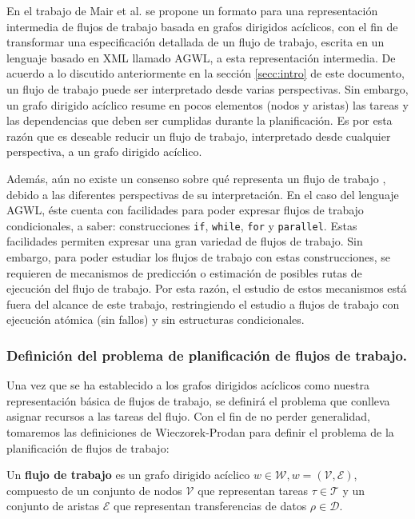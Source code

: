 En el trabajo de Mair et al. \cite{mair2007workflow} se propone un formato para una representación intermedia de flujos de trabajo basada en grafos dirigidos acíclicos, con el fin de transformar una especificación detallada de un flujo de trabajo, escrita en un lenguaje basado en XML llamado AGWL, a esta representación intermedia. De acuerdo a lo discutido anteriormente en la sección \ref{secc:intro} de este documento, un flujo de trabajo puede ser interpretado desde varias perspectivas. Sin embargo, un grafo dirigido acíclico resume en pocos elementos (nodos y aristas) las tareas y las dependencias que deben ser cumplidas durante la planificación. Es por esta razón que es deseable reducir un flujo de trabajo, interpretado desde cualquier perspectiva, a un grafo dirigido acíclico.

Además, aún no existe un consenso sobre qué representa un flujo de trabajo \cite{van2003workflow}, debido a las diferentes perspectivas de su interpretación. En el caso del lenguaje AGWL, éste cuenta con facilidades para poder expresar flujos de trabajo condicionales, a saber: construcciones \texttt{if}, \texttt{while}, \texttt{for} y \texttt{parallel}. Estas facilidades permiten expresar una gran variedad de flujos de trabajo. Sin embargo, para poder estudiar los flujos de trabajo con estas construcciones, se requieren de mecanismos de predicción o estimación de posibles rutas de ejecución del flujo de trabajo. Por esta razón, el estudio de estos mecanismos está fuera del alcance de este trabajo, restringiendo el estudio a flujos de trabajo con ejecución atómica (sin fallos) y sin estructuras condicionales.

\subsubsection{Definición del problema de planificación de flujos de trabajo.}
Una vez que se ha establecido a los grafos dirigidos acíclicos como nuestra representación básica de flujos de trabajo, se definirá el problema que conlleva asignar recursos a las tareas del flujo. Con el fin de no perder generalidad, tomaremos las definiciones de Wieczorek-Prodan \cite{wieczorek2008taxonomies} para definir el problema de la planificación de flujos de trabajo:

\begin{defn}
Un \textbf{flujo de trabajo} es un grafo dirigido acíclico $w \in \mathcal{W}, w = (\mathcal{V},\mathcal{E})$, compuesto de un conjunto de nodos $\mathcal{V}$ que representan tareas $ \tau \in \mathcal{T}$ y un conjunto de aristas $\mathcal{E}$ que representan transferencias de datos $ \rho \in \mathcal{D}$.
\end{defn}

